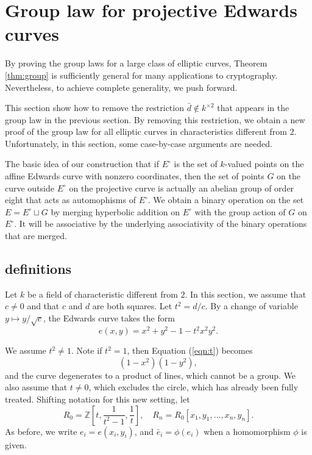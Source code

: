 \documentclass[12pt]{article}
\newcommand{\ring}[1]{\mathbb{#1}}
\newcommand{\Eoo}{E^{\circ}}
\begin{document}
\section{Group law for projective Edwards curves}

By proving the group laws for a large class of elliptic curves,
Theorem \ref{thm:group} is sufficiently general for many applications
to cryptography.  Nevertheless, to achieve complete generality, we
push forward.

This section show how to remove the restriction $\bar d\not\in
k^{\times 2}$ that appears in the group law in the previous section.
By removing this restriction, we obtain a new proof of the group law
for all elliptic curves in characteristics different from $2$.
Unfortunately, in this section, some case-by-case arguments are
needed.

The basic idea of our construction that if $\Eoo$ is the set of
$k$-valued points on the affine Edwards curve with nonzero
coordinates, then the set of points $G$ on the curve outside $\Eoo$ on
the projective curve is actually an abelian group of order eight that
acts as automophisms of $\Eoo$.  We obtain a binary operation on the
set $E=\Eoo\sqcup G$ by merging hyperbolic addition on $\Eoo$ with the
group action of $G$ on $\Eoo$.  It will be associative by the
underlying associativity of the binary operations that are merged.

\subsection{definitions}

Let $k$ be a field of characteristic different from $2$.  In this
section, we assume that $c\ne 0$ and that $c$ and $d$ are both
squares.  Let $t^2 = d/c$.  By a change of variable $y\mapsto
y/\sqrt{c}$, the Edwards curve takes the form
\begin{equation}\label{eqn:t}
e(x,y)= x^2 + y^2 -1 - t^2 x^2 y^2.
\end{equation}

We assume $t^2\ne 1$.  Note if $t^2=1$, then Equation (\ref{eqn:t})
becomes
\[
(1-x^2)(1-y^2),
\]
and the curve degenerates to a product of lines, which cannot be a
group.  We also assume that $t\ne 0$, which excludes the circle, which
has already been fully treated.  Shifting notation for this new
setting, let
\[
R_0 = \ring{Z}[t,\frac{1}{t^2-1},\frac1t],\quad
R_n = R_0[x_1,y_1,\ldots,x_n,y_n].
\]
As before, we write $e_i = e(x_i,y_i)$, and $\bar e_i = \phi(e_i)$ when a
homomorphism $\phi$ is given.
\end{document}
